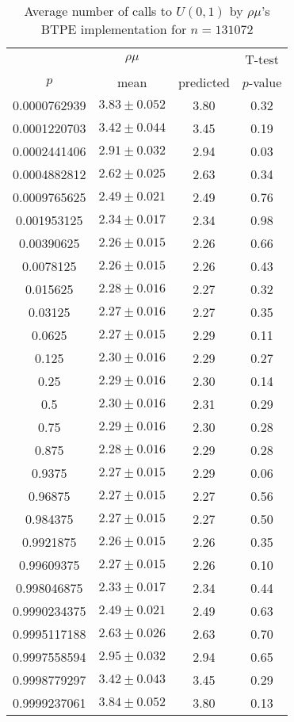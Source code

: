\begin{table}[t]
\caption{Average number of calls to $U(0,1)$ by $\rho\mu$'s BTPE implementation for $n=131072$}
\label{tab:calls131072}
\begin{tabular}{cccc} \hline
    & $\rho\mu$ & & T-test \\
$p$ & mean & predicted & $p$-value \\ \hline
0.0000762939 & $3.83 \pm 0.052$ & 3.80 & 0.32 \\
0.0001220703 & $3.42 \pm 0.044$ & 3.45 & 0.19 \\
0.0002441406 & $2.91 \pm 0.032$ & 2.94 & 0.03 \\
0.0004882812 & $2.62 \pm 0.025$ & 2.63 & 0.34 \\
0.0009765625 & $2.49 \pm 0.021$ & 2.49 & 0.76 \\
0.001953125  & $2.34 \pm 0.017$ & 2.34 & 0.98 \\
0.00390625   & $2.26 \pm 0.015$ & 2.26 & 0.66 \\
0.0078125    & $2.26 \pm 0.015$ & 2.26 & 0.43 \\
0.015625     & $2.28 \pm 0.016$ & 2.27 & 0.32 \\
0.03125      & $2.27 \pm 0.016$ & 2.27 & 0.35 \\
0.0625       & $2.27 \pm 0.015$ & 2.29 & 0.11 \\
0.125        & $2.30 \pm 0.016$ & 2.29 & 0.27 \\
0.25         & $2.29 \pm 0.016$ & 2.30 & 0.14 \\
0.5          & $2.30 \pm 0.016$ & 2.31 & 0.29 \\
0.75         & $2.29 \pm 0.016$ & 2.30 & 0.28 \\
0.875        & $2.28 \pm 0.016$ & 2.29 & 0.28 \\
0.9375       & $2.27 \pm 0.015$ & 2.29 & 0.06 \\
0.96875      & $2.27 \pm 0.015$ & 2.27 & 0.56 \\
0.984375     & $2.27 \pm 0.015$ & 2.27 & 0.50 \\
0.9921875    & $2.26 \pm 0.015$ & 2.26 & 0.35 \\
0.99609375   & $2.27 \pm 0.015$ & 2.26 & 0.10 \\
0.998046875  & $2.33 \pm 0.017$ & 2.34 & 0.44 \\
0.9990234375 & $2.49 \pm 0.021$ & 2.49 & 0.63 \\
0.9995117188 & $2.63 \pm 0.026$ & 2.63 & 0.70 \\
0.9997558594 & $2.95 \pm 0.032$ & 2.94 & 0.65 \\
0.9998779297 & $3.42 \pm 0.043$ & 3.45 & 0.29 \\
0.9999237061 & $3.84 \pm 0.052$ & 3.80 & 0.13 \\
\hline
\end{tabular}
\end{table}


